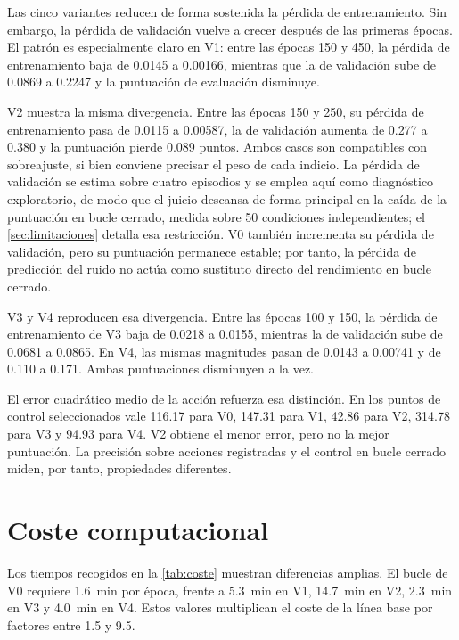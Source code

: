 Las cinco variantes reducen de forma sostenida la p\'erdida de entrenamiento. Sin embargo,
la p\'erdida de validaci\'on vuelve a crecer despu\'es de las primeras \'epocas. El patr\'on
es especialmente claro en V1: entre las \'epocas \num{150} y \num{450}, la p\'erdida de
entrenamiento baja de \num{0.0145} a \num{0.00166}, mientras que la de validaci\'on sube
de \num{0.0869} a \num{0.2247} y la puntuaci\'on de evaluaci\'on disminuye.

V2 muestra la misma divergencia. Entre las \'epocas \num{150} y \num{250}, su p\'erdida de
entrenamiento pasa de \num{0.0115} a \num{0.00587}, la de validaci\'on aumenta de
\num{0.277} a \num{0.380} y la puntuaci\'on pierde \num{0.089} puntos. Ambos casos son
compatibles con sobreajuste, si bien conviene precisar el peso de cada indicio. La p\'erdida
de validaci\'on se estima sobre cuatro episodios y se emplea aqu\'i como diagn\'ostico
exploratorio, de modo que el juicio descansa de forma principal en la ca\'ida de la
puntuaci\'on en bucle cerrado, medida sobre \num{50} condiciones independientes; el
\cref{sec:limitaciones} detalla esa restricci\'on. V0 tambi\'en incrementa su p\'erdida de
validaci\'on, pero su puntuaci\'on permanece estable; por tanto, la p\'erdida de predicci\'on
del ruido no act\'ua como sustituto directo del rendimiento en bucle cerrado.

V3 y V4 reproducen esa divergencia. Entre las \'epocas \num{100} y \num{150}, la p\'erdida
de entrenamiento de V3 baja de \num{0.0218} a \num{0.0155}, mientras la de validaci\'on
sube de \num{0.0681} a \num{0.0865}. En V4, las mismas magnitudes pasan de \num{0.0143} a
\num{0.00741} y de \num{0.110} a \num{0.171}. Ambas puntuaciones disminuyen a la vez.

El error cuadr\'atico medio de la acci\'on refuerza esa distinci\'on. En los puntos de
control seleccionados vale \num{116.17} para V0, \num{147.31} para V1, \num{42.86} para
V2, \num{314.78} para V3 y \num{94.93} para V4. V2 obtiene el menor error, pero no la
mejor puntuaci\'on. La precisi\'on sobre acciones registradas y el control en bucle cerrado
miden, por tanto, propiedades diferentes.

\section{Coste computacional}
\label{sec:coste-resultados}

Los tiempos recogidos en la \cref{tab:coste} muestran diferencias amplias. El bucle de V0
requiere \SI{1.6}{\minute} por \'epoca, frente a \SI{5.3}{\minute} en V1,
\SI{14.7}{\minute} en V2, \SI{2.3}{\minute} en V3 y \SI{4.0}{\minute} en V4. Estos valores
multiplican el coste de la l\'inea base por factores entre \num{1.5} y \num{9.5}.

